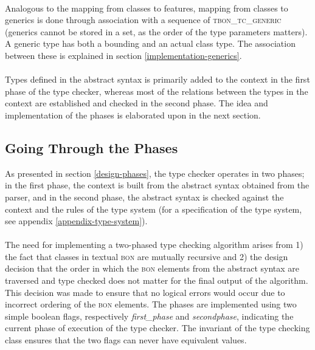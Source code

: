 \paragraph{} Analogous to the mapping from classes to features, mapping from classes to generics is done through association with a sequence of \textsc{tbon\_tc\_generic}  (generics cannot be stored in a set, as the order of the type parameters matters). A generic type has both a bounding and an actual class type. The association between these is explained in section \ref{implementation-generics}.

\paragraph{}
Types defined in the abstract syntax is primarily added to the context in the first phase of the type checker, whereas most of the relations between the types in the context are established and checked in the second phase. The idea and implementation of the phases is elaborated upon in the next section.

\subsection{Going Through the Phases}
\label{implementation-phases}
As presented in section \ref{design-phases}, the type checker operates in two phases; in the first phase, the context is built from the abstract syntax obtained from the parser, and in the second phase, the abstract syntax is checked against the context and the rules of the type system (for a specification of the type system, see appendix \ref{appendix-type-system}).
\paragraph{} %
The need for implementing a two-phased type checking algorithm arises from 1) the fact that classes in textual \textsc{bon} are mutually recursive and 2) the design decision that the order in which the \textsc{bon} elements from the abstract syntax are traversed and type checked does not matter for the final output of the algorithm. This decision was made to ensure that no logical errors would occur due to incorrect ordering of the \textsc{bon} elements.
The phases are implemented using two simple boolean flags, respectively \textit{first\_phase} and \textit{second\textunderscore phase}, indicating the current phase of execution of the type checker. The invariant of the type checking class ensures that the two flags can never have equivalent values.

